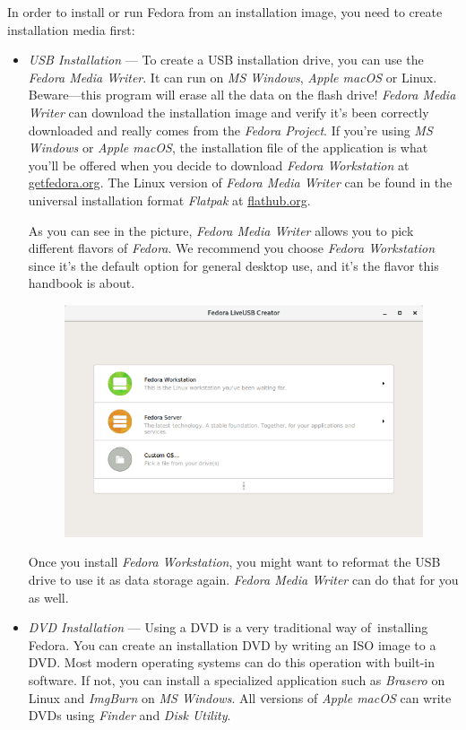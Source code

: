 In order to install or run Fedora from an installation image, you need to create installation media first:
\begin{itemize}
\item\emph{USB Installation} --- To create a USB installation drive, you can use the \emph{Fedora Media Writer}. It can run on \emph{MS Windows}, \emph{Apple macOS} or Linux. Beware---this program will erase all the data on the flash drive! \emph{Fedora Media Writer} can download the installation image and verify it's been correctly downloaded and really comes from the \emph{Fedora Project}. If you're using \emph{MS Windows} or \emph{Apple macOS}, the installation file of the application is what you'll be offered when you decide to download \emph{Fedora Workstation} at \url{getfedora.org}. The Linux version of \emph{Fedora Media Writer} can be found in the universal installation format \emph{Flatpak} at \url{flathub.org}.

As you can see in the picture, \emph{Fedora Media Writer} allows you to pick different flavors of \emph{Fedora}. We recommend you choose \emph{Fedora Workstation} since it's the default option for general desktop use, and it's the flavor this handbook is about.

\begin{figure}[htbp]
\begin{center}
\includegraphics[width=.75\textwidth]{img/fedora-media-writer}
 \label{fig:fedora_media_writer}
\end{center}
\end{figure}

Once you install \emph{Fedora Workstation}, you might want to reformat the USB drive to use it as data storage again. \emph{Fedora Media Writer} can do that for you as well.

\item\emph{DVD Installation} --- Using a DVD is a very traditional way of~installing Fedora. You can create an installation DVD by writing an ISO image to a DVD. Most modern operating systems can do this operation with built-in software. If not, you can install a specialized application such as \emph{Brasero} on Linux and \emph{ImgBurn} on \emph{MS Windows}. All versions of \emph{Apple macOS} can write DVDs using \emph{Finder} and \emph{Disk Utility}.
\end{itemize}

